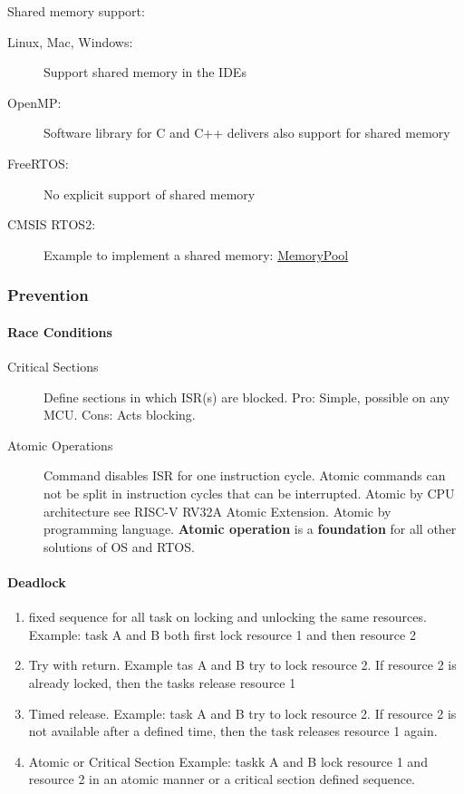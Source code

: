 Shared memory support:
\begin{description}
  \item[Linux, Mac, Windows:] Support shared memory in the IDEs
  \item[OpenMP:] Software library for C and C++ delivers also support for shared memory
  \item[FreeRTOS:] No explicit support of shared memory
  \item[CMSIS RTOS2:] Example to implement a shared memory: \href{https://arm-software.github.io/CMSIS_5/RTOS2/html/rtos_api2.html}{MemoryPool}
\end{description}

\subsubsection{Prevention}
\paragraph{Race Conditions}
\begin{description}
  \item[Critical Sections] Define sections in which ISR(s) are blocked.
        Pro: Simple, possible on any MCU.
        Cons: Acts blocking.
  \item[Atomic Operations] Command disables ISR for one instruction cycle.
        Atomic commands can not be split in instruction cycles that can be interrupted.
        Atomic by CPU architecture see RISC-V RV32A Atomic Extension.
        Atomic by programming language.
        \textbf{Atomic operation} is a \textbf{foundation} for all other solutions of OS and RTOS.
\end{description}

\paragraph{Deadlock}
\begin{enumerate}
  \item fixed sequence for all task on locking and unlocking the same resources.
        Example: task A and B both first lock resource 1 and then resource 2
  \item Try with return.
        Example tas A and B try to lock resource 2.
        If resource 2 is already locked, then the tasks release resource 1
  \item Timed release.
        Example: task A and B try to lock resource 2.
        If resource 2 is not available after a defined time, then the task releases resource 1 again.
  \item Atomic or Critical Section
        Example: taskk A and B lock resource 1 and resource 2 in an atomic manner or a critical section defined sequence.
\end{enumerate}

